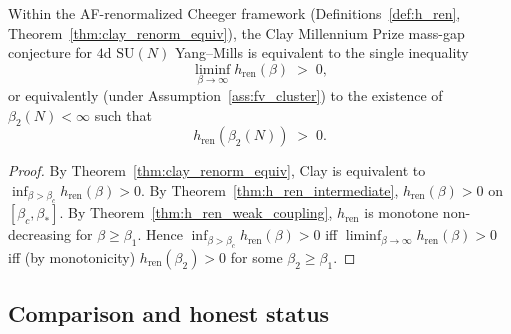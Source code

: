 \begin{theorem}
\label{thm:clay_final_reduced}
Within the AF-renormalized Cheeger framework
(Definitions~\ref{def:h_ren}, Theorem~\ref{thm:clay_renorm_equiv}),
the Clay Millennium Prize mass-gap conjecture for $4$d
$\mathrm{SU}(N)$ Yang--Mills is equivalent to the single
inequality
\begin{equation}
\label{eq:clay_final}
  \liminf_{\beta\to\infty}h_{\mathrm{ren}}(\beta)\;>\;0,
\end{equation}
or equivalently (under Assumption~\ref{ass:fv_cluster}) to the
existence of $\beta_{2}(N)<\infty$ such that
\begin{equation}
\label{eq:clay_final_finite}
  h_{\mathrm{ren}}(\beta_{2}(N))\;>\;0.
\end{equation}
\end{theorem}

\begin{proof}
By Theorem~\ref{thm:clay_renorm_equiv}, Clay is equivalent to
$\inf_{\beta>\beta_{c}}h_{\mathrm{ren}}(\beta)>0$. By
Theorem~\ref{thm:h_ren_intermediate}, $h_{\mathrm{ren}}(\beta)>0$
on $[\beta_{c},\beta_{*}]$. By
Theorem~\ref{thm:h_ren_weak_coupling}, $h_{\mathrm{ren}}$ is
monotone non-decreasing for $\beta\ge\beta_{1}$. Hence
$\inf_{\beta>\beta_{c}}h_{\mathrm{ren}}(\beta)>0$ iff
$\liminf_{\beta\to\infty}h_{\mathrm{ren}}(\beta)>0$ iff (by
monotonicity) $h_{\mathrm{ren}}(\beta_{2})>0$ for some
$\beta_{2}\ge\beta_{1}$.
\end{proof}

\subsection{Comparison and honest status}
\label{ssec:af_honest}


